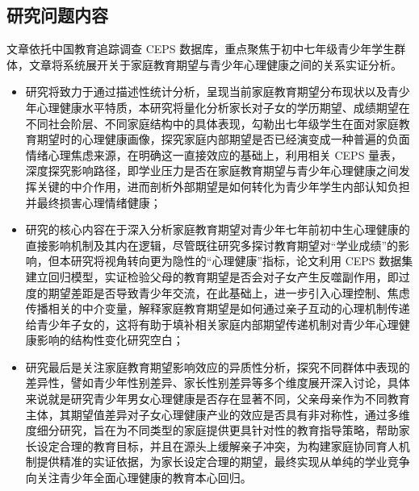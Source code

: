 \documentclass[zihao = -4, linespread = 1.5]{article}
\begin{document}
\subsection{研究问题内容}
文章依托中国教育追踪调查 CEPS 数据库，重点聚焦于初中七年级青少年学生群体，文章将系统展开关于家庭教育期望与青少年心理健康之间的关系实证分析。

\begin{itemize}
    \item 研究将致力于通过描述性统计分析，呈现当前家庭教育期望分布现状以及青少年心理健康水平特质，本研究将量化分析家长对子女的学历期望、成绩期望在不同社会阶层、不同家庭结构中的具体表现，勾勒出七年级学生在面对家庭教育期望时的心理健康画像，探究家庭内部期望是否已经演变成一种普遍的负面情绪心理焦虑来源，在明确这一直接效应的基础上，利用相关 CEPS 量表，深度探究影响路径，即学业压力是否在家庭教育期望与青少年心理健康之间发挥关键的中介作用，进而剖析外部期望是如何转化为青少年学生内部认知负担并最终损害心理情绪健康；
    \item 研究的核心内容在于深入分析家庭教育期望对青少年七年前初中生心理健康的直接影响机制及其内在逻辑，尽管既往研究多探讨教育期望对“学业成绩”的影响，但本研究将视角转向更为隐性的“心理健康”指标，论文利用 CEPS 数据集建立回归模型，实证检验父母的教育期望是否会对子女产生反噬副作用，即过度的期望差距是否导致青少年交流，在此基础上，进一步引入心理控制、焦虑传播相关的中介变量，解释家庭教育期望是如何通过亲子互动的心理机制传递给青少年子女的，这将有助于填补相关家庭内部期望传递机制对青少年心理健康影响的结构性变化研究空白；
    \item 研究最后是关注家庭教育期望影响效应的异质性分析，探究不同群体中表现的差异性，譬如青少年性别差异、家长性别差异等多个维度展开深入讨论，具体来说就是研究青少年男女心理健康是否存在显著不同，父亲母亲作为不同教育主体，其期望值差异对子女心理健康产业的效应是否具有非对称性，通过多维度细分研究，旨在为不同类型的家庭提供更具针对性的教育指导策略，帮助家长设定合理的教育目标，并且在源头上缓解亲子冲突，为构建家庭协同育人机制提供精准的实证依据，为家长设定合理的期望，最终实现从单纯的学业竞争向关注青少年全面心理健康的教育本心回归。
\end{itemize}
\end{document}
